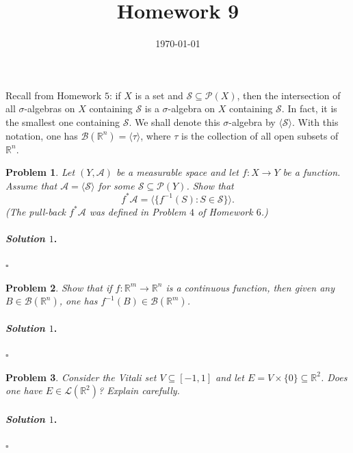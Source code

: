 \documentclass[reqno]{amsart}
\theoremstyle{plain}
\newtheorem{problem}{Problem}
\theoremstyle{definition}
\newenvironment{solution1}{\paragraph{\emph{Solution $1$}.}}{\hfill$\square$}
\begin{document}
 

\title[Homework 9]{Homework 9}

\date{\today} 
\maketitle 

Recall from Homework $5$:  if $X$ is a set and $\mathcal{S} \subseteq \mathcal{P}(X)$, then the intersection of all $\sigma$-algebras on $X$ containing $\mathcal{S}$ is a $\sigma$-algebra on $X$ containing $\mathcal{S}$.  In fact, it is the smallest one containing $\mathcal{S}$.  We shall denote this $\sigma$-algebra by $\langle \mathcal{S} \rangle$.  With this notation, one has $\mathcal{B}(\mathbb{R}^{n}) = \langle \tau \rangle$, where $\tau$ is the collection of all open subsets of $\mathbb{R}^{n}$.


\begin{problem}
Let $(Y,\mathcal{A})$ be a measurable space and let $f: X \rightarrow Y$ be a function.  Assume that $\mathcal{A} = \langle \mathcal{S} \rangle$ for some $\mathcal{S} \subseteq \mathcal{P}(Y)$.  Show that
$$f^{*}\mathcal{A}= \langle \{f^{-1}(S) : S \in \mathcal{S} \}\rangle. $$
(The pull-back $f^{*}\mathcal{A}$ was defined in Problem $4$ of Homework $6$.)
\end{problem}
\begin{solution1}

\end{solution1}

\begin{problem}
Show that if $f:\mathbb{R}^{m} \rightarrow \mathbb{R}^{n}$ is a continuous function, then given any $B \in \mathcal{B}(\mathbb{R}^{n})$, one has $f^{-1}(B) \in \mathcal{B}(\mathbb{R}^{m})$.
\end{problem}
\begin{solution1}

\end{solution1}



\begin{problem}
Consider the Vitali set $V \subseteq [-1,1]$ and let $E = V \times \{0\} \subseteq \mathbb{R}^{2}$.  Does one have $E \in \mathcal{L}(\mathbb{R}^{2})$?  Explain carefully.
\end{problem}
\begin{solution1}

\end{solution1}
\end{document}
